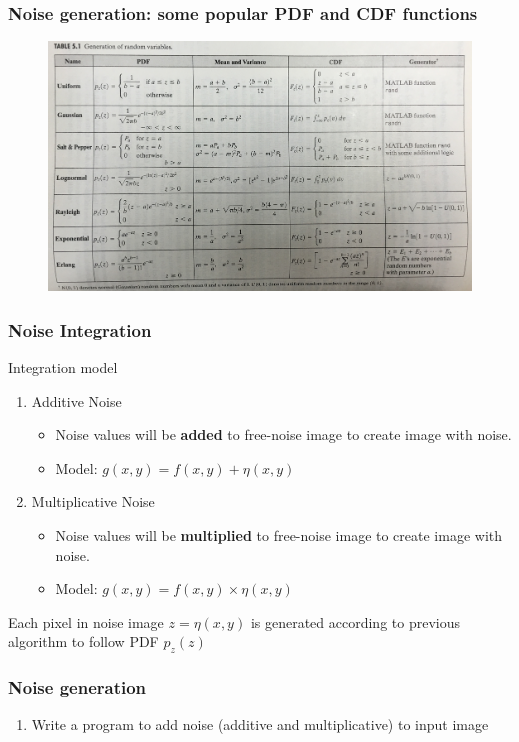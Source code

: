 \documentclass[english,11pt,table,handout]{beamer}
\begin{document}
\frame
{
	\frametitle{Noise generation: some popular PDF and CDF functions}
	
	\begin{figure}[!h]
		\includegraphics[scale=0.09]{pdf_cdf.jpg}
	\end{figure}
}
\frame
{
	\frametitle{Noise Integration}
	
	\begin{block}{Integration model}
		\begin{enumerate}
			\item Additive Noise
				\begin{itemize}
					\item Noise values will be \alert{\textbf{added}} to free-noise image to create image with noise.
					\item Model: $g(x,y) = f(x,y) + \eta(x,y)$
				\end{itemize}
				
			\item Multiplicative Noise
			\begin{itemize}
				\item Noise values will be \alert{\textbf{multiplied}} to free-noise image to create image with noise.
				\item Model: $g(x,y) = f(x,y) \times \eta(x,y)$
			\end{itemize}
			
		\end{enumerate}
	\end{block}
	\begin{alertblock}{}
		Each pixel in noise image $z = \eta(x,y)$ is generated according to previous algorithm to follow PDF $p_z(z)$
	\end{alertblock}
}
\begin{frame}[fragile]

	\frametitle{Noise generation}
	
	\begin{exercise}
		\begin{enumerate}
			\item Write a program to add noise (additive and multiplicative) to input image
		\end{enumerate}
	\end{exercise}
		
\end{frame}
\end{document}
